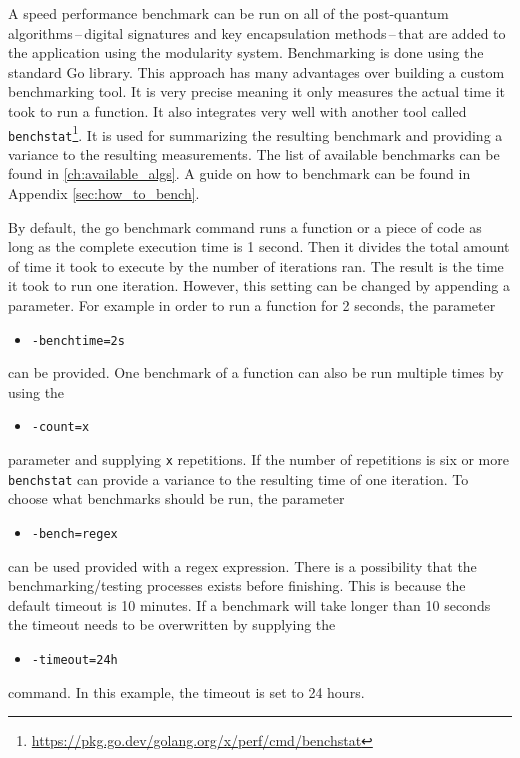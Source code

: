A speed performance benchmark can be run on all of the post-quantum algorithms\,--\,digital signatures and key encapsulation methods\,--\,that are added to the application using the modularity system. Benchmarking is done using the standard Go library. This approach has many advantages over building a custom benchmarking tool. It is very precise meaning it only measures the actual time it took to run a function.
It also integrates very well with another tool called \texttt{benchstat}\footnote{\url{https://pkg.go.dev/golang.org/x/perf/cmd/benchstat}}. It is used for summarizing the resulting benchmark and providing a variance to the resulting measurements. The list of available benchmarks can be found in \ref{ch:available_algs}. A guide on how to benchmark can be found in Appendix \ref{sec:how_to_bench}.

By default, the go benchmark command runs a function or a piece of code as long as the complete execution time is 1 second. Then it divides the total amount of time it took to execute by the number of iterations ran. The result is the time it took to run one iteration. However, this setting can be changed by appending a parameter. For example in order to run a function for 2 seconds, the parameter
\begin{itemize}
  \item \texttt{-benchtime=2s}
\end{itemize}
can be provided. One benchmark of a function can also be run multiple times by using the
\begin{itemize}
  \item \texttt{-count=x}
\end{itemize}
parameter and supplying \texttt{x} repetitions. If the number of repetitions is six or more \texttt{benchstat} can provide a variance to the resulting time of one iteration. To choose what benchmarks should be run, the parameter
\begin{itemize}
  \item \texttt{-bench=regex}
\end{itemize}
can be used provided with a regex expression. There is a possibility that the benchmarking/testing processes exists before finishing. This is because the default timeout is 10 minutes. If a benchmark will take longer than 10 seconds the timeout needs to be overwritten by supplying the
\begin{itemize}
  \item \texttt{-timeout=24h}
\end{itemize}
command. In this example, the timeout is set to 24 hours.
